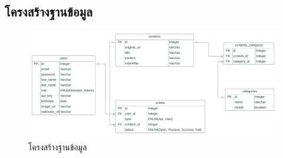 \documentclass[12pt,oneside,openright,a4paper]{cpe-thai-project}
\begin{document}
\begin{itemize}
\section{โครงสร้างฐานข้อมูล}
\begin{figure}[!ht]\centering
  \includegraphics[width=\textwidth]{./img/database.png}
  \caption{โครงสร้างฐานข้อมูล}\label{fig:database} 
\end{figure}


\end{itemize}
\end{document}
